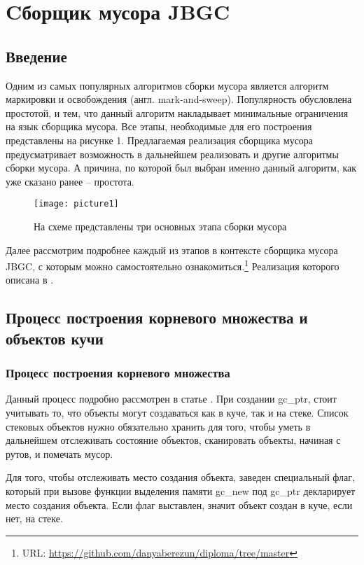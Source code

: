 

\section{Cборщик мусора JBGC}
\subsection{Введение}
Одним из самых популярных алгоритмов сборки мусора является  алгоритм маркировки и освобождения (англ. mark-and-sweep). Популярность обусловлена простотой, и тем, что данный алгоритм накладывает минимальные ограничения на язык сборщика мусора. Все этапы, необходимые для его построения представлены на рисунке 1.  Предлагаемая реализация сборщика мусора предусматривает возможность в дальнейшем реализовать и другие алгоритмы сборки мусора.  А причина, по которой был выбран именно данный алгоритм, как уже сказано ранее -- простота.


\begin{figure}[h!]
	\centering
	\texttt{[image: picture1]}
	\caption{На схеме представлены три основных этапа сборки мусора}
	\centering
\end{figure}

Далее рассмотрим подробнее каждый из этапов в контексте сборщика мусора JBGC,  с которым можно самостоятельно ознакомиться.\footnote{URL: \url{https://github.com/danyaberezun/diploma/tree/master}} Реализация которого описана в \cite{realisation}.



\subsection{Процесс построения корневого множества и объектов кучи}
\subsubsection{Процесс построения корневого множества}
Данный процесс подробно рассмотрен в статье \cite{roots}.
При создании gc\_ptr, стоит учитывать то, что объекты могут создаваться как в куче, так и на стеке. Список стековых объектов  нужно обязательно хранить для того, чтобы уметь в дальнейшем отслеживать состояние объектов, сканировать объекты, начиная с рутов, и помечать мусор. 

Для того, чтобы отслеживать место создания объекта, заведен специальный флаг, который при вызове функции выделения памяти gc\_new  под gc\_ptr декларирует место создания объекта. Если флаг выставлен, значит объект создан в куче, если нет, на стеке.

